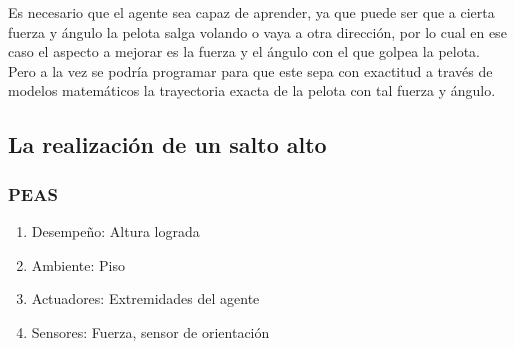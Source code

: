 \documentclass{article}
\begin{document}
                Es necesario que el agente sea capaz de aprender, ya que puede ser que a cierta fuerza y ángulo la pelota salga volando o vaya a otra dirección, por lo cual en ese caso el aspecto a mejorar es la fuerza y el ángulo con el que golpea la pelota. Pero a la vez se podría programar para que este sepa con exactitud a través de modelos matemáticos la trayectoria exacta de la pelota con tal fuerza y ángulo.

        \subsection{La realización de un salto alto}
            \subsubsection{PEAS}
                \begin{enumerate}
                    \item Desempeño: Altura lograda
                    \item Ambiente: Piso 
                    \item Actuadores: Extremidades del agente
                    \item Sensores: Fuerza, sensor de orientación
                \end{enumerate}
\end{document}
